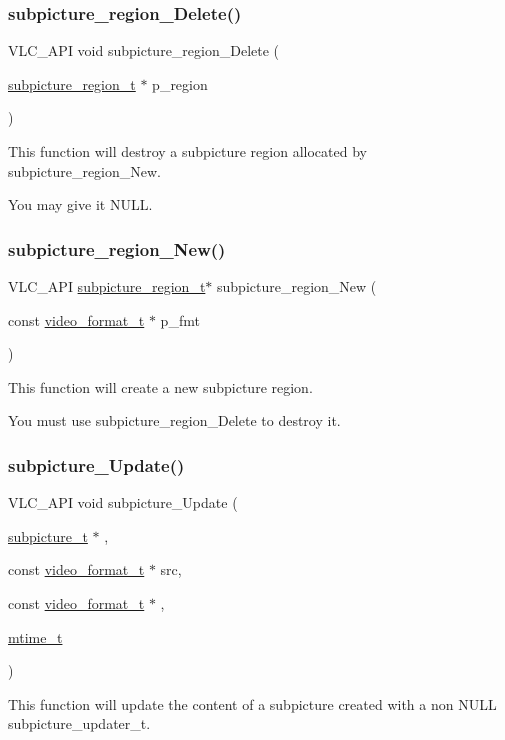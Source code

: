 \subsubsection{\texorpdfstring{subpicture\+\_\+region\+\_\+\+Delete()}{subpicture\_region\_Delete()}}
{\footnotesize\ttfamily V\+L\+C\+\_\+\+A\+PI void subpicture\+\_\+region\+\_\+\+Delete (\begin{DoxyParamCaption}\item[{\hyperlink{structsubpicture__region__t}{subpicture\+\_\+region\+\_\+t} $\ast$}]{p\+\_\+region }\end{DoxyParamCaption})}

This function will destroy a subpicture region allocated by subpicture\+\_\+region\+\_\+\+New.

You may give it N\+U\+LL. \mbox{\label{group__subpicture_ga3cf9611325cfd60f346be7f6d2075cf3}} 
\subsubsection{\texorpdfstring{subpicture\+\_\+region\+\_\+\+New()}{subpicture\_region\_New()}}
{\footnotesize\ttfamily V\+L\+C\+\_\+\+A\+PI \hyperlink{structsubpicture__region__t}{subpicture\+\_\+region\+\_\+t}$\ast$ subpicture\+\_\+region\+\_\+\+New (\begin{DoxyParamCaption}\item[{const \hyperlink{structvideo__format__t}{video\+\_\+format\+\_\+t} $\ast$}]{p\+\_\+fmt }\end{DoxyParamCaption})}

This function will create a new subpicture region.

You must use subpicture\+\_\+region\+\_\+\+Delete to destroy it. \mbox{\label{group__subpicture_gaece760ee2ccc467fc2eb91fda3163d9b}} 
\subsubsection{\texorpdfstring{subpicture\+\_\+\+Update()}{subpicture\_Update()}}
{\footnotesize\ttfamily V\+L\+C\+\_\+\+A\+PI void subpicture\+\_\+\+Update (\begin{DoxyParamCaption}\item[{\hyperlink{structsubpicture__t}{subpicture\+\_\+t} $\ast$}]{,  }\item[{const \hyperlink{structvideo__format__t}{video\+\_\+format\+\_\+t} $\ast$}]{src,  }\item[{const \hyperlink{structvideo__format__t}{video\+\_\+format\+\_\+t} $\ast$}]{,  }\item[{\hyperlink{vlc__common_8h_a996e47c5ea061215703c26738351279e}{mtime\+\_\+t}}]{ }\end{DoxyParamCaption})}

This function will update the content of a subpicture created with a non N\+U\+LL subpicture\+\_\+updater\+\_\+t. 